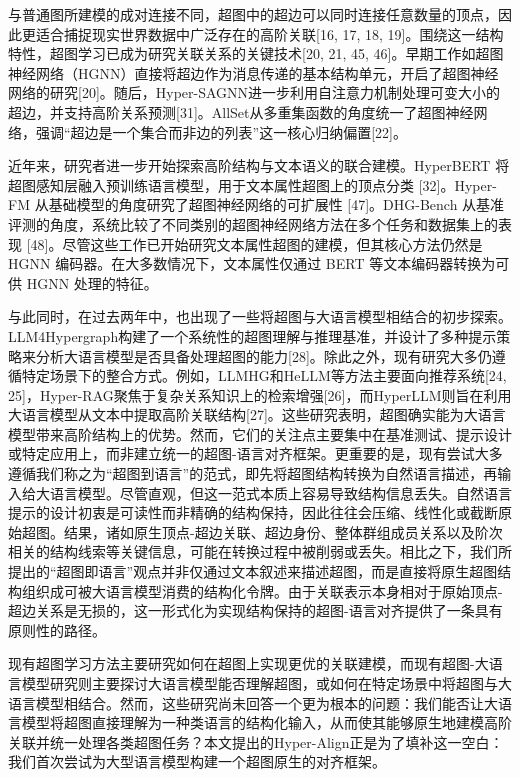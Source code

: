 \documentclass[10pt]{article}
\begin{document}
与普通图所建模的成对连接不同，超图中的超边可以同时连接任意数量的顶点，因此更适合捕捉现实世界数据中广泛存在的高阶关联[16, 17, 18, 19]。围绕这一结构特性，超图学习已成为研究关联关系的关键技术[20, 21, 45, 46]。早期工作如超图神经网络（HGNN）直接将超边作为消息传递的基本结构单元，开启了超图神经网络的研究[20]。随后，Hyper-SAGNN进一步利用自注意力机制处理可变大小的超边，并支持高阶关系预测[31]。AllSet从多重集函数的角度统一了超图神经网络，强调“超边是一个集合而非边的列表”这一核心归纳偏置[22]。

近年来，研究者进一步开始探索高阶结构与文本语义的联合建模。HyperBERT 将超图感知层融入预训练语言模型，用于文本属性超图上的顶点分类 [32]。Hyper-FM 从基础模型的角度研究了超图神经网络的可扩展性 [47]。DHG-Bench 从基准评测的角度，系统比较了不同类别的超图神经网络方法在多个任务和数据集上的表现 [48]。尽管这些工作已开始研究文本属性超图的建模，但其核心方法仍然是 HGNN 编码器。在大多数情况下，文本属性仅通过 BERT 等文本编码器转换为可供 HGNN 处理的特征。

与此同时，在过去两年中，也出现了一些将超图与大语言模型相结合的初步探索。LLM4Hypergraph构建了一个系统性的超图理解与推理基准，并设计了多种提示策略来分析大语言模型是否具备处理超图的能力[28]。除此之外，现有研究大多仍遵循特定场景下的整合方式。例如，LLMHG和HeLLM等方法主要面向推荐系统[24, 25]，Hyper-RAG聚焦于复杂关系知识上的检索增强[26]，而HyperLLM则旨在利用大语言模型从文本中提取高阶关联结构[27]。这些研究表明，超图确实能为大语言模型带来高阶结构上的优势。然而，它们的关注点主要集中在基准测试、提示设计或特定应用上，而非建立统一的超图-语言对齐框架。更重要的是，现有尝试大多遵循我们称之为“超图到语言”的范式，即先将超图结构转换为自然语言描述，再输入给大语言模型。尽管直观，但这一范式本质上容易导致结构信息丢失。自然语言提示的设计初衷是可读性而非精确的结构保持，因此往往会压缩、线性化或截断原始超图。结果，诸如原生顶点-超边关联、超边身份、整体群组成员关系以及阶次相关的结构线索等关键信息，可能在转换过程中被削弱或丢失。相比之下，我们所提出的“超图即语言”观点并非仅通过文本叙述来描述超图，而是直接将原生超图结构组织成可被大语言模型消费的结构化令牌。由于关联表示本身相对于原始顶点-超边关系是无损的，这一形式化为实现结构保持的超图-语言对齐提供了一条具有原则性的路径。

现有超图学习方法主要研究如何在超图上实现更优的关联建模，而现有超图-大语言模型研究则主要探讨大语言模型能否理解超图，或如何在特定场景中将超图与大语言模型相结合。然而，这些研究尚未回答一个更为根本的问题：我们能否让大语言模型将超图直接理解为一种类语言的结构化输入，从而使其能够原生地建模高阶关联并统一处理各类超图任务？本文提出的Hyper-Align正是为了填补这一空白：我们首次尝试为大型语言模型构建一个超图原生的对齐框架。
\end{document}
